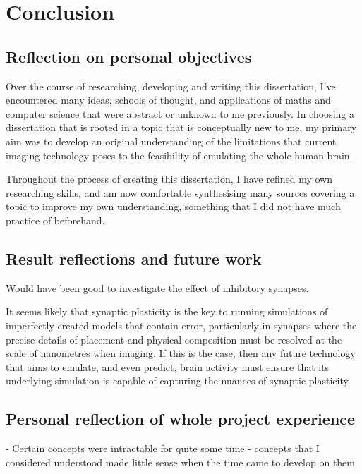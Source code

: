 \chapter{Conclusion}

\section{Reflection on personal objectives}

Over the course of researching, developing and writing this dissertation, I've
encountered many ideas, schools of thought, and applications of maths and
computer science that were abstract or unknown to me previously. In choosing a
dissertation that is rooted in a topic that is conceptually new to me, my
primary aim was to develop an original understanding of the limitations that
current imaging technology poses to the feasibility of emulating the whole human
brain. 

Throughout the process of creating this dissertation, I have refined my own
researching skills, and am now comfortable synthesising many sources
covering a topic to improve my own understanding, something that I did not have
much practice of beforehand. 

\section{Result reflections and future work}

Would have been good to investigate the effect of inhibitory synapses.

It seems likely that synaptic plasticity is the key to running simulations of
imperfectly created models that contain error, particularly in synapses where
the precise details of placement and physical composition must be resolved at
the scale of nanometres when imaging. If this is the case, then any future
technology that aims to emulate, and even predict, brain activity must ensure
that its underlying simulation is capable of capturing the nuances of synaptic plasticity.

\section{Personal reflection of whole project experience}
 - Certain concepts were intractable for quite some time 
 - concepts that I considered understood made little sense when the time came to
 develop on them 



